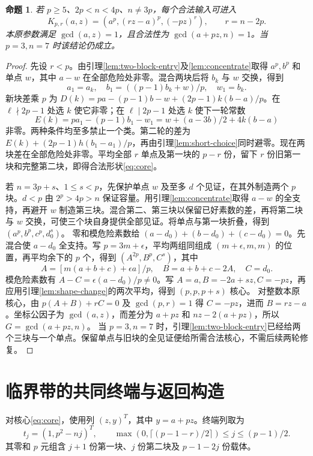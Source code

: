 \documentclass[11pt,a4paper]{article}
\newtheorem{proposition}[theorem]{命题}
\theoremstyle{definition}
\numberwithin{equation}{section}
\begin{document}
\begin{proposition}\label{prop:entry}
若 $p\ge5$、$2p<n<4p$、$n\ne3p$，每个合法输入可进入
\begin{equation}\label{eq:core}
K_{p,r}(a,z)=(a^p,(rz-a)^p,(-pz)^r),\qquad r=n-2p.
\end{equation}
本原参数满足 $\gcd(a,z)=1$，且合法性为 $\gcd(a+pz,n)=1$。当 $p=3,n=7$ 时该结论仍成立。
\end{proposition}
\begin{proof}
先设 $r<p$。由引理\ref{lem:two-block-entry}及\ref{lem:concentrate}取得 $a^p,b^p$ 和单点 $w$，其中 $a-w$ 在全部危险处非零。混合两块后将 $b_k$ 与 $w$ 交换，得到
\[
a_1=a_k,\quad b_1=((p-1)b_k+w)/p,\quad w_1=b_k.
\]
新块差乘 $p$ 为 $D(k)=pa-(p-1)b-w+(2p-1)k(b-a)/p$。在 $\ell\nmid2p-1$ 处选 $k$ 使它非零；在 $\ell\mid2p-1$ 处选 $k$ 使下一轮常数
\[E(k)=pa_1-(p-1)b_1-w_1=w+(a-3b)/2+4k(b-a)
\]
非零。两种条件均至多禁止一个类。第二轮的差为 $E(k)+(2p-1)h(b_1-a_1)/p$，再由引理\ref{lem:short-choice}同时避零。现在两块差在全部危险处非零。平均全部 $r$ 单点及第一块的 $p-r$ 份，留下 $r$ 份旧第一块和完整第二块，即得合法形状\eqref{eq:core}。

若 $n=3p+s$、$1\le s<p$，先保护单点 $w$ 及至多 $d$ 个见证，在其外制造两个 $p$ 块。$d<p$ 由 $2^p>4p>n$ 保证容量。用引理\ref{lem:concentrate}取得 $a-w$ 的全支持，再避开 $w$ 制造第三块。混合第二、第三块以保留已好素数的差，再将第二块与 $w$ 交换，可使三个块自身提供全部见证。将单点与第一块折叠，得到 $(a^p,b^p,c^p,d_0^s)$。
零和模危险素数给 $(a-d_0)+(b-d_0)+(c-d_0)=0$。先混合使 $a-d_0$ 全支持。写 $p=3m+\epsilon$，平均两组同组成 $(m+\epsilon,m,m)$ 的位置，再平均余下的 $p$ 个，得到 $(A^{2p},B^p,C^s)$，其中
\[
A=[m(a+b+c)+\epsilon a]/p,\quad B=a+b+c-2A,\quad C=d_0.
\]
模危险素数有 $A-C=\epsilon(a-d_0)/p\ne0$。写 $A=a,B=-2a+sz,C=-pz$，再应用引理\ref{lem:shape-change}的两次平均，得到 $(p,p,p+s)$ 核心。
对整数本原核心，由 $p(A+B)+rC=0$ 及 $\gcd(p,r)=1$ 得 $C=-pz$，进而 $B=rz-a$。坐标公因子为 $\gcd(a,z)$，而差分为 $a+pz$ 和 $nz-2(a+pz)$，所以 $G=\gcd(a+pz,n)$。
当 $p=3,n=7$ 时，引理\ref{lem:two-block-entry}已经给两个三块与一个单点。保留单点与旧块的全见证便给所需合法核心，不需后续两轮修复。
\end{proof}

\section{临界带的共同终端与返回构造}
对核心\eqref{eq:core}，使用列 $(z,y)^T$，其中 $y=a+pz$。终端列取为
\begin{equation}\label{eq:terminal}
t_j=(1,p^2-nj)^T,\qquad
\max(0,\lceil(p-1-r)/2\rceil)\le j\le(p-1)/2.
\end{equation}
其零和 $p$ 元组含 $j+1$ 份第一块、$j$ 份第二块及 $p-1-2j$ 份载体。
\end{document}

